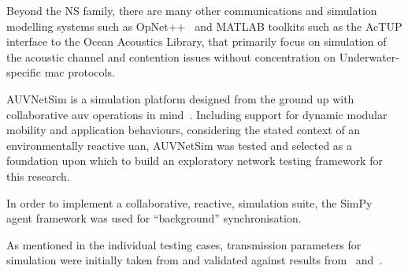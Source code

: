 Beyond the NS family, there are many other communications and simulation modelling systems such as OpNet++~\cite{Chang1999} and MATLAB toolkits such as the AcTUP interface to the Ocean Acoustics Library, that primarily focus on simulation of the acoustic channel and contention issues without concentration on Underwater-specific \gls{mac} protocols.

AUVNetSim is a simulation platform designed from the ground up with collaborative \gls{auv} operations in mind~\cite{Miquel2008}.
Including support for dynamic modular mobility and application behaviours, considering the stated context of an environmentally reactive \gls{uan}, AUVNetSim was tested and selected as a foundation upon which to build an exploratory network testing framework for this research.

In order to implement a collaborative, reactive, simulation suite, the SimPy~\cite{Mueller2003SimPy} agent framework was used for ``background'' synchronisation.

As mentioned in the individual testing cases, transmission parameters for simulation were initially taken from and validated against results from~\citet{Stojanovic2007} and~\citet{Stefanov2011}.


\begin{comment}
\subsection{Routing and Network Design for \glspl{uan}}

Forward Error Correction coding is used on such channels to minimise packet losses.

\todo{ADD:Summary of Akyildiz02/05}

\todo{FIX:callback to routing discussion in c1 explain why fbr is the best of everything all the time}
\end{comment}
\pagebreak


